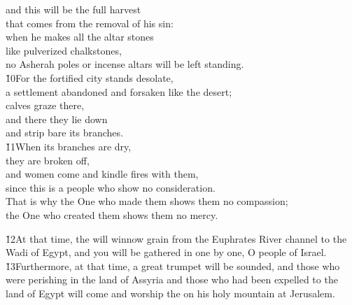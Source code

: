 \begin{poetry}
\poemll    and this will be the full harvest \\
\poemlll       that comes from the removal of his sin: \\
\poeml when he makes all the altar stones \\
\poemll    like pulverized chalkstones, \\
\poeml no Asherah poles or incense altars will be left standing. \\
\poeml \v{10}For the fortified city stands desolate, \\
\poemll    a settlement abandoned and forsaken like the desert; \\
\poeml calves graze there, \\
\poemll    and there they lie down \\
\poemlll       and strip bare its branches. \\
\poeml \v{11}When its branches are dry, \\
\poemll    they are broken off, \\
\poeml and women come and kindle fires with them, \\
\poemll    since this is a people who show no consideration. \\
\poeml That is why the One who made them shows them no compassion; \\
\poemll    the One who created them shows them no mercy.
\end{poetry}

\v{12}At that time, the  will winnow grain from the Euphrates River channel to the Wadi of Egypt, and you will be gathered in one by one, O people of Israel. \v{13}Furthermore, at that time, a great trumpet will be sounded, and those who were perishing in the land of Assyria and those who had been expelled to the land of Egypt will come and worship the  on his holy mountain at Jerusalem.

